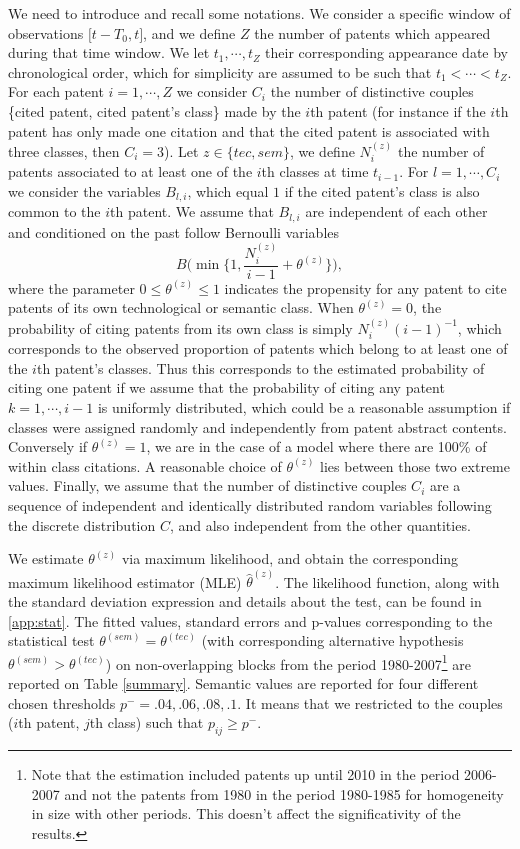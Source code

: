 \documentclass[article]{article}%
\begin{document}
We need to introduce and recall some notations. We consider a specific window of observations $\big[t- T_0, t \big]$, and we define $Z$ the number of patents which appeared during that time window. We let $t_1, \cdots, t_Z$ their corresponding appearance date by chronological order, which for simplicity are assumed to be such that $t_1 < \cdots < t_Z$. For each patent $i=1, \cdots, Z$ we consider $C_i$ the number of distinctive couples \{cited patent, cited patent's class\} made by the $i$th patent (for instance if the $i$th patent has only made one citation and that the cited patent is associated with three classes, then $C_i = 3$). Let $z \in \{tec, sem\}$, we define $N_{i}^{(z)}$  the number of patents associated to at least one of the $i$th classes at time $t_{i-1}$. For $l = 1, \cdots, C_i$ we consider the variables $B_{l,i}$, which equal $1$ if the cited patent's class is also common to the $i$th patent. We assume that $B_{l,i}$ are independent of each other and conditioned on the past follow Bernoulli variables 
$$B \Big( \min \Big\{ 1, \frac{N_{i}^{(z)}}{i-1} + \theta^{(z)} \Big\} \Big),$$ 
where the parameter $0 \leq \theta^{(z)} \leq 1$ indicates the propensity for any patent to cite patents of its own technological or semantic class. When $\theta^{(z)} = 0$, the probability of citing patents from its own class is simply $N_{i}^{(z)}(i-1)^{-1}$, which corresponds to the observed proportion of patents which belong to at least one of the $i$th patent's classes. Thus this corresponds to the estimated probability of citing one patent if we assume that the probability of citing any patent $k=1, \cdots, i-1$ is uniformly distributed, which could be a reasonable assumption if classes were assigned randomly and independently from patent abstract contents. Conversely if $\theta^{(z)} = 1$, we are in the case of a model where there are 100\% of within class citations. A reasonable choice of $\theta^{(z)}$ lies between those two extreme values. Finally, we assume that the number of distinctive couples $C_i$ are a sequence of independent and identically distributed random variables following the discrete distribution $C$, and also independent from the other quantities.

We estimate $\theta^{(z)}$ via maximum likelihood, and obtain the corresponding maximum likelihood estimator (MLE) $\hat{\theta}^{(z)}$. The likelihood function, along with the standard deviation expression and details about the test, can be found in \ref{app:stat}. The fitted values, standard errors and p-values corresponding to the statistical test $\theta^{(sem)} = \theta^{(tec)}$ (with corresponding alternative hypothesis $\theta^{(sem)} > \theta^{(tec)}$) on non-overlapping blocks from the period 1980-2007\footnote{Note that the estimation included patents up until 2010 in the period 2006-2007 and not the patents from 1980 in the period 1980-1985 for homogeneity in size with other periods. This doesn't affect the significativity of the results.} are reported on Table \ref{summary}. Semantic values are reported for four different chosen thresholds $p^{-}=.04, .06, .08, .1$. It means that we restricted to the couples ($i$th patent, $j$th class) such that $p_{ij} \geq p^{-}$. 
\end{document}
